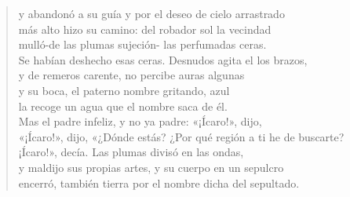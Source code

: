 \begin{quote}
{{            y abandonó a su guía y por el deseo de cielo arrastrado\\
            más alto hizo su camino: del robador sol la vecindad\\
            mulló-de las plumas sujeción- las perfumadas ceras.\\
            Se habían deshecho esas ceras. Desnudos agita el los brazos,\\
            y de remeros carente, no percibe auras algunas\\
            y su boca, el paterno nombre gritando, azul\\
            la recoge un agua que el nombre saca de él.\\
            Mas el padre infeliz, y no ya padre: «¡Ícaro!», dijo,\\
            «¡Ícaro!», dijo, «¿Dónde estás? ¿Por qué región a ti he de buscarte?\\
            ¡Ícaro!», decía. Las plumas divisó en las ondas,\\
            y maldijo sus propias artes, y su cuerpo en un sepulcro\\
            encerró, también tierra por el nombre dicha del sepultado.
        }
    }
\end{quote}
